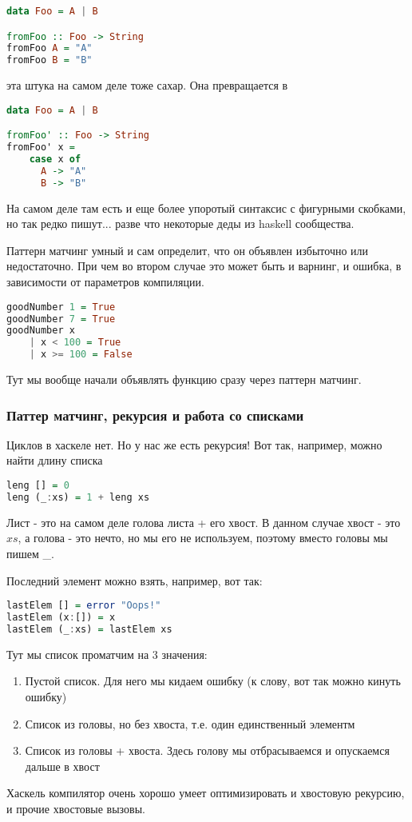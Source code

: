 \documentclass[10pt, a4paper]{article}
\begin{document}
\begin{lstlisting}[language=haskell]
data Foo = A | B

fromFoo :: Foo -> String 
fromFoo A = "A"
fromFoo B = "B"
\end{lstlisting}

эта штука на самом деле тоже сахар. Она превращается в 

\begin{lstlisting}[language=haskell]
data Foo = A | B

fromFoo' :: Foo -> String 
fromFoo' x = 
    case x of
      A -> "A"
      B -> "B"
\end{lstlisting}

На самом деле там есть и еще более упоротый синтаксис с фигурными скобками, но так редко пишут... разве что некоторые деды из haskell сообщества.

Паттерн матчинг умный и сам определит, что он объявлен избыточно или недостаточно. При чем во втором случае это может быть и варнинг, и ошибка, в зависимости от параметров компиляции.

\begin{lstlisting}[language=haskell]
goodNumber 1 = True
goodNumber 7 = True
goodNumber x 
    | x < 100 = True
    | x >= 100 = False 
\end{lstlisting}

Тут мы вообще начали объявлять функцию сразу через паттерн матчинг.

\subsubsection{Паттер матчинг, рекурсия и работа со списками}
Циклов в хаскеле нет. Но у нас же есть рекурсия! Вот так, например, можно найти длину списка
\begin{lstlisting}[language=haskell]
leng [] = 0
leng (_:xs) = 1 + leng xs 
\end{lstlisting}

Лист - это на самом деле голова листа + его хвост. В данном случае хвост - это $xs$, а голова - это нечто, но мы его не используем, поэтому вместо головы мы пишем \_.

Последний элемент можно взять, например, вот так:
\begin{lstlisting}[language=haskell]
lastElem [] = error "Oops!"
lastElem (x:[]) = x
lastElem (_:xs) = lastElem xs
\end{lstlisting}

Тут мы список проматчим на 3 значения:
\begin{enumerate}
	\item Пустой список. Для него мы кидаем ошибку (к слову, вот так можно кинуть ошибку)
	\item Список из головы, но без хвоста, т.е. один единственный элементм
	\item Список из головы + хвоста. Здесь голову мы отбрасываемся и опускаемся дальше в хвост
\end{enumerate}

Хаскель компилятор очень хорошо умеет оптимизировать и хвостовую рекурсию, и прочие хвостовые вызовы.
\end{document}
